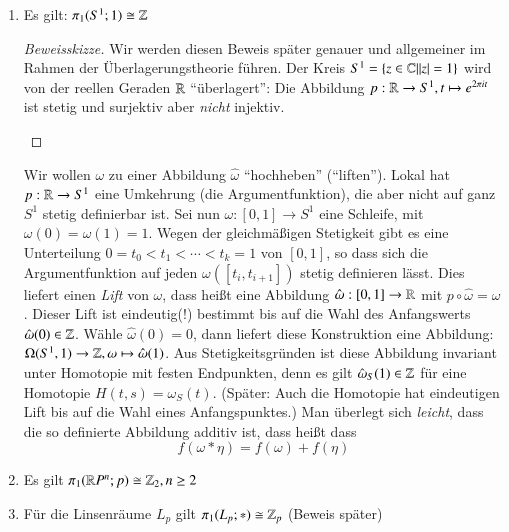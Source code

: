 \documentclass[a4paper,10pt]{scrartcl}
\newcommand{\homo}{\cong}
\begin{document}
\begin{exs*}
\begin{enumerate}[(1)]
\item Es gilt: $\pi_1(S^1; 1)\homo \Z$
\begin{proof}[Beweisskizze]
Wir werden diesen Beweis später genauer und allgemeiner im Rahmen der Überlagerungstheorie führen. Der Kreis $S^1=\{ z\in \mathbb{C}| |z|=1\}$ wird von der reellen Geraden $\mathbb{R}$ "`überlagert"': Die Abbildung $p:  \mathbb{R}\to S^1, t\mapsto e^{2\pi i t}$ ist stetig und surjektiv aber \emph{nicht} injektiv.\\
\begin{figure}[ht]
\centering

\caption{}
\end{figure}
\end{proof}
Wir wollen $\omega$ zu einer Abbildung $\hat\omega$ "`hochheben"' ("`liften"'). Lokal hat $p: \mathbb{R}  \to S^1$ eine Umkehrung (die Argumentfunktion), die aber nicht auf ganz $S^1$ stetig definierbar ist. Sei nun $\omega: [0,1]\to S^1$ eine Schleife, mit $\omega(0)=\omega(1)=1$. Wegen der gleichmäßigen Stetigkeit gibt es eine Unterteilung $0=t_0<t_1<\dotsb <t_k=1$ von $[0,1]$, so dass sich  die Argumentfunktion auf jeden $\omega([t_i, t_{i+1}])$ stetig definieren lässt. Dies liefert einen \emph{Lift} von $\omega$, dass heißt eine Abbildung $\hat \omega: [0,1]\to \mathbb{R}$ mit $p \circ \hat \omega=\omega$. Dieser Lift ist eindeutig(!) bestimmt bis auf die Wahl des Anfangswerts $\hat \omega(0) \in \mathbb{Z}$. Wähle $\hat \omega(0)=0$, dann liefert diese Konstruktion eine Abbildung: $\Omega(S^1, 1)\to \mathbb{Z}, \omega \mapsto \hat \omega(1)$. Aus Stetigkeitsgründen ist diese Abbildung invariant unter Homotopie mit festen Endpunkten, denn es gilt $\hat \omega_S(1)\in \mathbb{Z}$ für eine Homotopie $H(t,s)=\omega_S(t)$. (Später: Auch die Homotopie hat eindeutigen Lift bis auf die Wahl eines Anfangspunktes.) Man überlegt sich \emph{leicht}, dass die so definierte Abbildung additiv ist, dass heißt dass
\[
 f(\omega*\eta)=f(\omega)+f(\eta)
\]
\item Es gilt $\pi_1(\R P^n; p)\homo \Z_2, n\ge 2$
 \begin{table}[h]
 \end{table}
\item Für die Linsenräume $L_p$ gilt $\pi_1(L_p;*)\homo \Z_p$ (Beweis später)


\end{enumerate}
\end{exs*}
\end{document}
